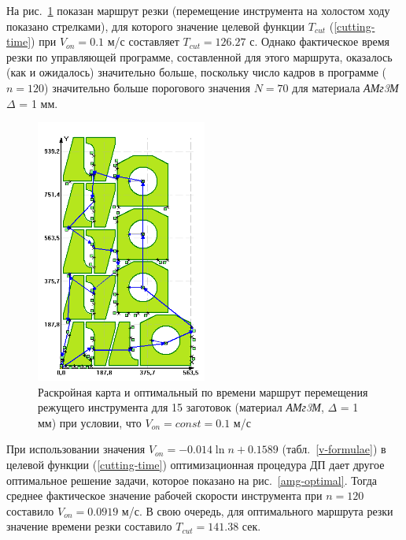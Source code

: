 \documentclass[11pt,twoside,openany]{report}
\begin{document}
На рис.~\ref{amg-cutting}
показан маршрут резки
(перемещение инструмента на холостом ходу показано стрелками),
для которого значение целевой функции
$T_{cut}$ (\ref{cutting-time})
при
$V_{on}=0.1$ м/с
составляет
$T_{cut}=126.27$ с.
Однако фактическое время резки по управляющей программе,
составленной для этого маршрута,
оказалось (как и ожидалось)
значительно больше,
поскольку число кадров в программе ($n=120$)
значительно больше порогового значения $N=70$
для материала
{\it АМг3М}
$\Delta$ = 1 мм.

\begin{figure}[h]
  \begin{center}
  \includegraphics[width=0.5\textwidth]{amg-cutting.png}
  \caption{
    Раскройная карта и оптимальный по времени маршрут
    перемещения режущего инструмента для 15 заготовок
    (материал {\it АМг3М},
    $\Delta$ = 1 мм)
    при условии, что
    $V_{on}=const=0.1$ м/с}
  \label{amg-cutting}
  \end{center}
\end{figure}

При использовании значения
$V_{on}=-0.014 \ln n + 0.1589$
(табл.~\ref{v-formulae})
в целевой функции (\ref{cutting-time})
оптимизационная процедура ДП
дает другое оптимальное решение задачи,
которое показано на рис.~\ref{amg-optimal}.
Тогда среднее фактическое значение
рабочей скорости инструмента при $n=120$
составило
$V_{on}=0.0919$ м/с.
В свою очередь,
для оптимального маршрута резки значение времени резки составило
$T_{cut}=141.38$ сек.
\end{document}
